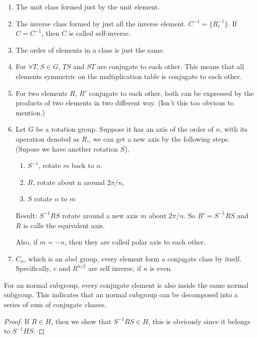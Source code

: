 \begin{fact}$ $

    \begin{enumerate}
        \item The unit class formed just by the unit element.
        \item The inverse class formed by just all the inverse element.
            $C^{-1} = \{ R_i^{-1}\}$. If $C=C^{-1}$, then $C$ is called
            self-inverse.
        \item The order of elements in a class is just the same.
        \item For $\forall T,S\in G$, $TS$ and $ST$ are conjugate to each
            other. This means that all elements symmetric on the
            multiplication table is conjugate to each other.
        \item For two elements $R$, $R'$ conjugate to each other, both
            can be expressed by the products of two elements in two
            different way. (Isn't this too obvious to mention.)
        \item Let $G$ be a rotation group. Suppose it has an axis of the
            order of $n$, with its operation denoted as $R$,, we can get
            a new axis by the following steps. (Supose we have another
            rotation $S$),

            \begin{enumerate}
                \item  $S^{-1}$, rotate $m$ back to $n$.
                \item  $R$, rotate about n around $2\pi/n$,
                \item  $S$ rotate $n$ to $m$
            \end{enumerate}

            Result: $S^{-1}RS$ rotate around a new axis $m$ about
            $2\pi/n$. So $R'=S^{-1}RS$ and $R$ is calle the equivalent
            axis. 
            
            Also, if $m=-n$, then they are called polar axis to each
            other.

        \item $C_n$, which is an abel group, every element form a
            conjugate class by itself. Specifically, $e$ and $R^{n/2}$
            are self inverse, if $n$ is even.
    \end{enumerate}
\end{fact}
\begin{prop}
    \label{prop:20161010.conjugate_subgroup}
    For an normal subgroup, every conjugate element is also
    inside the same normal subgroup. This indicates that an normal
    subgroup can be decomposed into a series of sum of conjugate classes.
\end{prop}
\begin{proof}
    If $R\in H$, then we show that $S^{-1}RS\in H$, this is obviously
    since it belongs to $S^{-1}HS$.
\end{proof}

